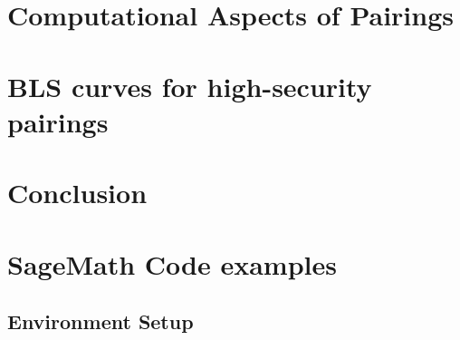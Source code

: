\documentclass[twoside,11pt,openright]{report}
\theoremstyle{definition}
\begin{document}
\chapter{Computational Aspects of Pairings}
\label{ch:pairingsbasics}





\chapter{BLS curves for high-security pairings}
\label{ch:blscurvefamilies}





\chapter*{Conclusion}






\cleardoublepage
{}
\printbibliography


\cleardoublepage
\appendix
\chapter{SageMath Code examples}
\label{apx_implementation}

\section*{Environment Setup}

\end{document}
